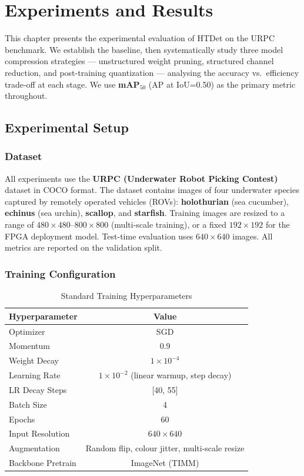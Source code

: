 \chapter{Experiments and Results}

This chapter presents the experimental evaluation of HTDet on the URPC benchmark. We establish the baseline, then systematically study three model compression strategies --- unstructured weight pruning, structured channel reduction, and post-training quantization --- analysing the accuracy vs.\ efficiency trade-off at each stage.
We use \textbf{mAP$_{50}$} (AP at IoU=0.50) as the primary metric throughout.

\section{Experimental Setup}

\subsection{Dataset}

All experiments use the \textbf{URPC (Underwater Robot Picking Contest)} dataset in COCO format. The dataset contains images of four underwater species captured by remotely operated vehicles (ROVs): \textbf{holothurian} (sea cucumber), \textbf{echinus} (sea urchin), \textbf{scallop}, and \textbf{starfish}. Training images are resized to a range of $480\times480$--$800\times800$ (multi-scale training), or a fixed $192\times192$ for the FPGA deployment model. Test-time evaluation uses $640\times640$ images. All metrics are reported on the validation split.

\subsection{Training Configuration}

\begin{table}[H]
\centering
\caption{Standard Training Hyperparameters}
\begin{tabular}{|l|c|}
\hline
\textbf{Hyperparameter} & \textbf{Value} \\
\hline
Optimizer & SGD \\
Momentum & 0.9 \\
Weight Decay & $1 \times 10^{-4}$ \\
Learning Rate & $1 \times 10^{-2}$ (linear warmup, step decay) \\
LR Decay Steps & [40, 55] \\
Batch Size & 4 \\
Epochs & 60 \\
Input Resolution & $640 \times 640$ \\
Augmentation & Random flip, colour jitter, multi-scale resize \\
Backbone Pretrain & ImageNet (TIMM) \\
\hline
\end{tabular}
\label{table:train_config}
\end{table}

